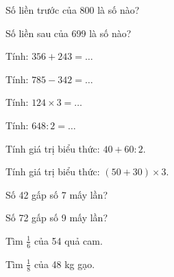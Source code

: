 \begin{ex}
Số liền trước của 800 là số nào?
\end{ex}

\begin{ex}
Số liền sau của 699 là số nào?
\end{ex}

\begin{ex}
Tính: $356 + 243 = \dots$
\end{ex}

\begin{ex}
Tính: $785 - 342 = \dots$
\end{ex}

\begin{ex}
Tính: $124 \times 3 = \dots$
\end{ex}

\begin{ex}
Tính: $648 : 2 = \dots$
\end{ex}

\begin{ex}
Tính giá trị biểu thức: $40 + 60 : 2$.
\end{ex}

\begin{ex}
Tính giá trị biểu thức: $(50 + 30) \times 3$.
\end{ex}

\begin{ex}
Số 42 gấp số 7 mấy lần?
\end{ex}

\begin{ex}
Số 72 gấp số 9 mấy lần?
\end{ex}

\begin{ex}
Tìm $\frac{1}{6}$ của 54 quả cam.
\end{ex}

\begin{ex}
Tìm $\frac{1}{8}$ của 48 kg gạo.
\end{ex}

